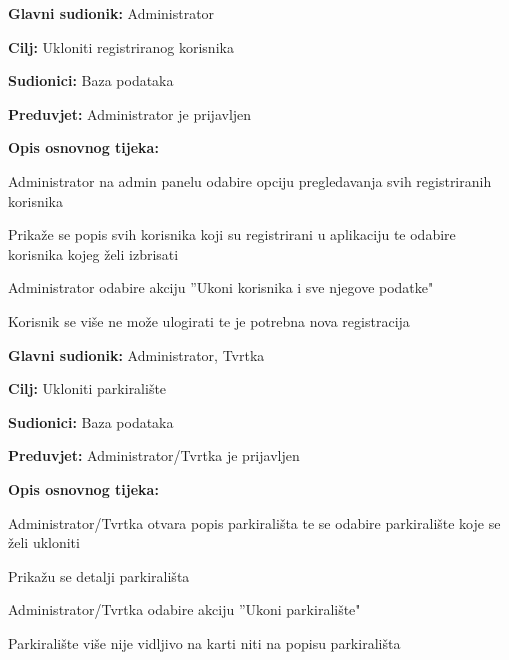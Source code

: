\noindent {}
\begin{packed_item}
	
	\item \textbf{Glavni sudionik:} Administrator
	\item  \textbf{Cilj:} Ukloniti registriranog korisnika
	\item  \textbf{Sudionici:} Baza podataka
	\item  \textbf{Preduvjet:} Administrator je prijavljen
	\item  \textbf{Opis osnovnog tijeka:}
	
	\item[] \begin{packed_enum}
		
		\item Administrator na admin panelu odabire opciju pregledavanja svih registriranih korisnika 
		\item Prikaže se popis svih korisnika koji su registrirani u aplikaciju te odabire korisnika kojeg želi izbrisati
		\item Administrator odabire akciju ”Ukoni korisnika i sve njegove podatke"
		\item Korisnik se više ne može ulogirati te je potrebna nova registracija

	\end{packed_enum}
\end{packed_item}

\noindent {}
\begin{packed_item}
	
	\item \textbf{Glavni sudionik:} Administrator, Tvrtka
	\item  \textbf{Cilj:} Ukloniti parkiralište
	\item  \textbf{Sudionici:} Baza podataka
	\item  \textbf{Preduvjet:} Administrator/Tvrtka je prijavljen
	\item  \textbf{Opis osnovnog tijeka:}
	
	\item[] \begin{packed_enum}
		
		\item Administrator/Tvrtka otvara popis parkirališta te se odabire parkiralište koje se želi ukloniti
		\item Prikažu se detalji parkirališta
		\item Administrator/Tvrtka odabire akciju ”Ukoni parkiralište"
		\item Parkiralište više nije vidljivo na karti niti na popisu parkirališta

	\end{packed_enum}
\end{packed_item}

